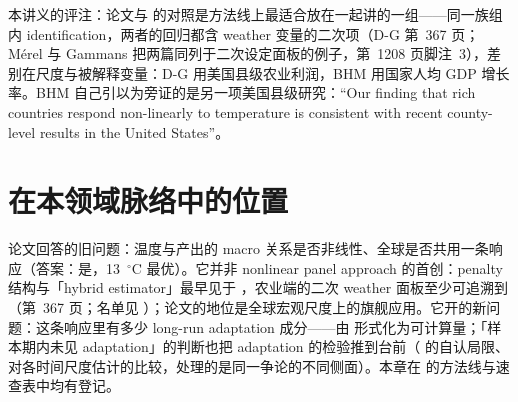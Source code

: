 本讲义的评注：论文与  的对照是方法线上最适合放在一起讲的一组——同一族组内 identification，两者的回归都含 weather 变量的二次项（D-G 第~367 页；Mérel 与 Gammans 把两篇同列于二次设定面板的例子，第~1208 页脚注~3），差别在尺度与被解释变量：D-G 用美国县级农业利润，BHM 用国家人均 GDP 增长率。BHM 自己引以为旁证的是另一项美国县级研究：``Our finding that rich countries respond non-linearly to temperature is consistent with recent county-level results in the United States''\citep[第~237 页；所引为 Deryugina 与 Hsiang 2014 的工作稿，正文参考文献~8]{burke2015global}。

\section{在本领域脉络中的位置}

论文回答的旧问题：温度与产出的 macro 关系是否非线性、全球是否共用一条响应（答案：是，13~$^\circ$C 最优）。它并非 nonlinear panel approach 的首创：penalty 结构与「hybrid estimator」最早见于 \citet{mcintosh2006identifying}，农业端的二次 weather 面板至少可追溯到 \citet{deschenes2007economic}（第~367 页；名单见 \citealp[第~1208 页脚注~3]{merel2021climate}）；论文的地位是全球宏观尺度上的旗舰应用。它开的新问题：这条响应里有多少 long-run adaptation 成分——由  形式化为可计算量；「样本期内未见 adaptation」的判断也把 adaptation 的检验推到台前（ 的自认局限、 对各时间尺度估计的比较，处理的是同一争论的不同侧面）。本章在  的方法线与速查表中均有登记。

\chapterrefs
